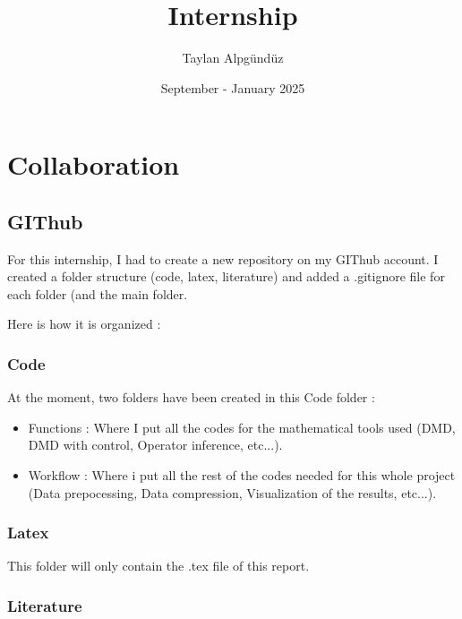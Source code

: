 \documentclass{article}
\title{Internship}
\author{Taylan Alpgündüz}
\date{September - January 2025}
\begin{document}
\maketitle

\vspace{2cm}

\section{Collaboration}

\vspace{1cm}

\subsection{GIThub}

\vspace{1cm}

For this internship, I had to create a new repository on my GIThub account. I created a folder structure (code, latex, literature) and added a .gitignore file for each folder (and the main folder.

Here is how it is organized : 

\subsubsection*{Code}


At the moment, two folders have been created in this Code folder : 

\begin{itemize}
    \item Functions : Where I put all the codes for the mathematical tools used (DMD, DMD with control, Operator inference, etc...).
    \item Workflow : Where i put all the rest of the codes needed for this whole project (Data prepocessing, Data compression, Visualization of the results, etc...).
\end{itemize}

\subsubsection*{Latex}


This folder will only contain the .tex file of this report.


\subsubsection*{Literature}
\end{document}
